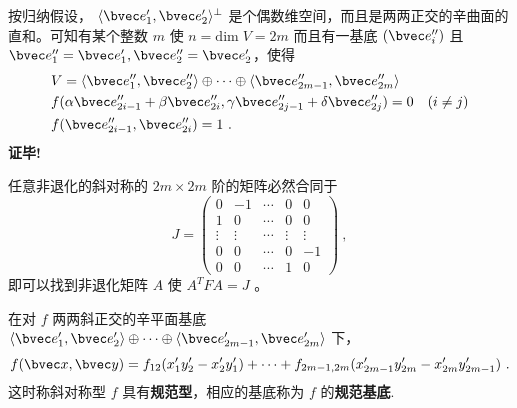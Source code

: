 按归纳假设， $\langle\bvec e'_1,\bvec e'_2\rangle^{\perp}$ 是个偶数维空间，而且是两两正交的辛曲面的直和。可知有某个整数 $m$ 使 $n=\mathrm{dim}\;V=2m$ 而且有一基底 $(\bvec e_i'')$ 且 $\bvec e''_1=\bvec e'_1,\bvec e''_2=\bvec e'_2$，使得
\begin{equation}
 \begin{aligned}
 &V=\langle\bvec e''_1,\bvec e''_2\rangle\oplus\cdots\oplus\langle\bvec e''_{2m-1},\bvec e''_{2m}\rangle\\
&f(\alpha\bvec e''_{2i-1}+\beta\bvec e''_{2i},\gamma\bvec e''_{2j-1}+\delta\bvec e''_{2j})=0\quad (i\neq j)\\
 &f(\bvec e''_{2i-1},\bvec e''_{2i})=1~.
 \end{aligned}
 \end{equation}
 \textbf{证毕!}
 \begin{corollary}{}
 任意非退化的斜对称的 $2m\times2m$ 阶的矩阵必然合同于
 \begin{equation}
 J=\begin{pmatrix}
 0&-1&\cdots&0&0\\
 1&0&\cdots&0&0\\
 \vdots&\vdots&\cdots&\vdots&\vdots\\
 0&0&\cdots&0&-1\\
 0&0&\cdots&1&0
 \end{pmatrix}~,
 \end{equation}
 即可以找到非退化矩阵 $A$ 使 $A^{T}FA=J$ 。
 \end{corollary}
 在对 $f$ 两两斜正交的辛平面基底 $\langle\bvec e'_1,\bvec e'_2\rangle\oplus\cdots\oplus\langle\bvec e'_{2m-1},\bvec e'_{2m}\rangle$ 下，
 \begin{equation}
 f(\bvec x,\bvec y)=f_{12}(x'_1y'_2-x'_2y'_1)+\cdots+f_{2m-1,2m}(x'_{2m-1}y'_{2m}-x'_{2m}y'_{2m-1})~.
 \end{equation}
 这时称斜对称型 $f$ 具有\textbf{规范型}，相应的基底称为 $f$ 的\textbf{规范基底}.
